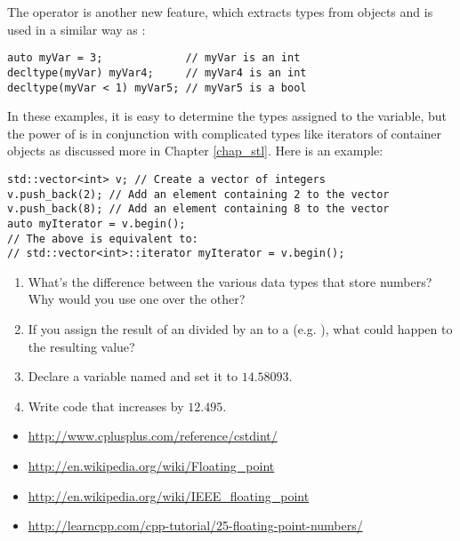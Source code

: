 The  operator is another new feature, which extracts types from objects and is used in a similar way as :

\noindent\begin{minipage}{\linewidth}\begin{lstlisting}
auto myVar = 3;             // myVar is an int
decltype(myVar) myVar4;     // myVar4 is an int
decltype(myVar < 1) myVar5; // myVar5 is a bool
\end{lstlisting}\end{minipage}

In these examples, it is easy to determine the types assigned to the variable, but the power of  is in conjunction with complicated types like iterators of container objects as discussed more in Chapter \ref{chap_stl}. Here is an example:

\noindent\begin{minipage}{\linewidth}\begin{lstlisting}
std::vector<int> v; // Create a vector of integers
v.push_back(2); // Add an element containing 2 to the vector
v.push_back(8); // Add an element containing 8 to the vector
auto myIterator = v.begin();
// The above is equivalent to:
// std::vector<int>::iterator myIterator = v.begin();
\end{lstlisting}\end{minipage}


\begin{enumerate}
	\item What's the difference between the various data types that store numbers? Why would you use one over the other?

	\item If you assign the result of an  divided by an  to a  (e.g. ), what could happen to the resulting value?

  \item Declare a variable named  and set it to $14.58093$.

 	\item Write code that increases  by $12.495$. 

\end{enumerate}




\begin{itemize}
\item \url{http://www.cplusplus.com/reference/cstdint/}
\item \url{http://en.wikipedia.org/wiki/Floating_point}
\item \url{http://en.wikipedia.org/wiki/IEEE_floating_point}
\item \url{http://learncpp.com/cpp-tutorial/25-floating-point-numbers/}
\end{itemize}	

